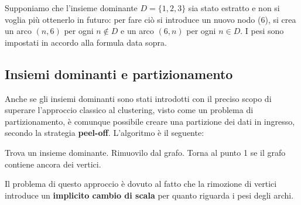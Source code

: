 \noindent Supponiamo che l'insieme dominante $D = \{1, 2, 3\}$ sia stato estratto e non si voglia più ottenerlo in futuro: per fare ciò si introduce un nuovo nodo ($6$), si crea un arco $(n, 6)$ per ogni $n \notin D$ e un arco $(6, n)$ per ogni $n \in D$. I pesi sono impostati in accordo alla formula data sopra.

\subsection{Insiemi dominanti e partizionamento}

Anche se gli insiemi dominanti sono stati introdotti con il preciso scopo di superare l'approccio classico al clustering, visto come un problema di partizionamento, è comunque possibile creare una partizione dei dati in ingresso, secondo la strategia \textbf{peel-off}. L'algoritmo è il seguente:
\begin{algorithmic}[1]
	\State Trova un insieme dominante.
	\State Rimuovilo dal grafo.
	\State Torna al punto 1 se il grafo contiene ancora dei vertici.
\end{algorithmic}
Il problema di questo approccio è dovuto al fatto che la rimozione di vertici introduce un \textbf{implicito cambio di scala} per quanto riguarda i pesi degli archi.